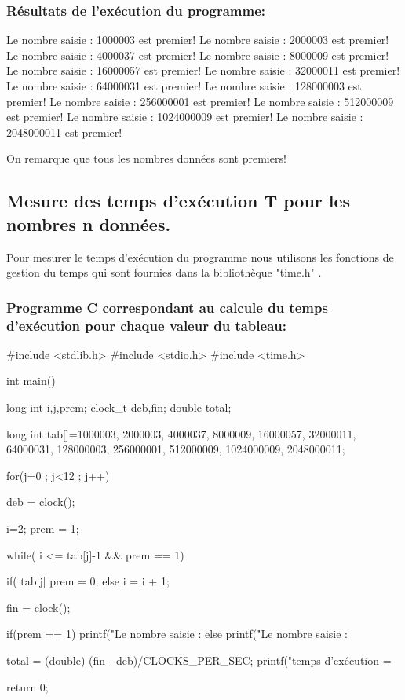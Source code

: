 \documentclass[12pt]{article}
\begin{document}
\subsubsection{Résultats de l'exécution du programme:}
\begin{sql}
Le nombre saisie : 1000003 est premier!
Le nombre saisie : 2000003 est premier!
Le nombre saisie : 4000037 est premier!
Le nombre saisie : 8000009 est premier!
Le nombre saisie : 16000057 est premier!
Le nombre saisie : 32000011 est premier!
Le nombre saisie : 64000031 est premier!
Le nombre saisie : 128000003 est premier!
Le nombre saisie : 256000001 est premier!
Le nombre saisie : 512000009 est premier!
Le nombre saisie : 1024000009 est premier!
Le nombre saisie : 2048000011 est premier!
\end{sql}

On remarque que tous les nombres données sont premiers!

\subsection{Mesure des temps d'exécution T pour les nombres n données.}

Pour mesurer le temps d'exécution du programme nous utilisons les fonctions de gestion du temps qui sont fournies dans la bibliothèque "time.h" .

\subsubsection{Programme C correspondant au calcule du temps d'exécution pour chaque valeur du tableau:}
\begin{sql}
#include <stdlib.h>
#include <stdio.h>
#include <time.h>

int main()
{
	long int i,j,prem;
	clock_t deb,fin;
	double total;

	long int tab[]={1000003, 2000003, 4000037, 8000009, 16000057, 32000011,	64000031, 128000003, 256000001,	512000009,	1024000009, 2048000011};

for(j=0 ; j<12 ; j++)
{
	deb = clock();
	
	i=2;
	prem = 1;

	while( i <= tab[j]-1 && prem == 1){

		if( tab[j]%
			prem = 0;
		else
			i = i + 1;
	}

	fin = clock();

	if(prem == 1)
    {
        printf("Le nombre saisie : %
    }
	else{
        printf("Le nombre saisie : %
	}

	total = (double) (fin - deb)/CLOCKS_PER_SEC;
	printf("temps d'exécution = %
}
return 0;
}
\end{sql}
\end{document}
